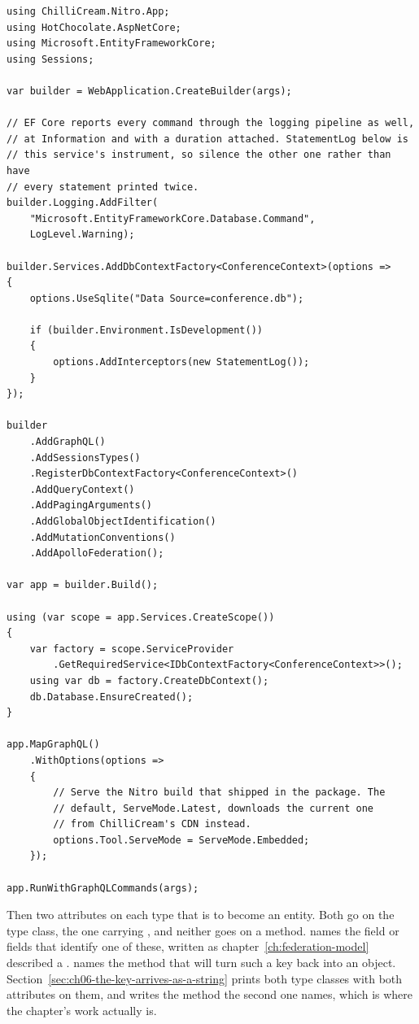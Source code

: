 \begin{verbatim}
using ChilliCream.Nitro.App;
using HotChocolate.AspNetCore;
using Microsoft.EntityFrameworkCore;
using Sessions;

var builder = WebApplication.CreateBuilder(args);

// EF Core reports every command through the logging pipeline as well,
// at Information and with a duration attached. StatementLog below is
// this service's instrument, so silence the other one rather than have
// every statement printed twice.
builder.Logging.AddFilter(
    "Microsoft.EntityFrameworkCore.Database.Command",
    LogLevel.Warning);

builder.Services.AddDbContextFactory<ConferenceContext>(options =>
{
    options.UseSqlite("Data Source=conference.db");

    if (builder.Environment.IsDevelopment())
    {
        options.AddInterceptors(new StatementLog());
    }
});

builder
    .AddGraphQL()
    .AddSessionsTypes()
    .RegisterDbContextFactory<ConferenceContext>()
    .AddQueryContext()
    .AddPagingArguments()
    .AddGlobalObjectIdentification()
    .AddMutationConventions()
    .AddApolloFederation();

var app = builder.Build();

using (var scope = app.Services.CreateScope())
{
    var factory = scope.ServiceProvider
        .GetRequiredService<IDbContextFactory<ConferenceContext>>();
    using var db = factory.CreateDbContext();
    db.Database.EnsureCreated();
}

app.MapGraphQL()
    .WithOptions(options =>
    {
        // Serve the Nitro build that shipped in the package. The
        // default, ServeMode.Latest, downloads the current one
        // from ChilliCream's CDN instead.
        options.Tool.ServeMode = ServeMode.Embedded;
    });

app.RunWithGraphQLCommands(args);
\end{verbatim}

%
%
Then two attributes on each type that is to become an entity. Both go on the
type class, the one carrying \code{[ObjectType<T>]}, and neither goes on a
method. \code{[Key]} names the field or fields that identify one of these,
written as
chapter~\ref{ch:federation-model} described a .
\code{[ReferenceResolver]} names the method that will turn such a key back into
an object. Section~\ref{sec:ch06-the-key-arrives-as-a-string} prints both type
classes with both attributes on them, and writes the method the second one
names, which is where the chapter's work actually is.

